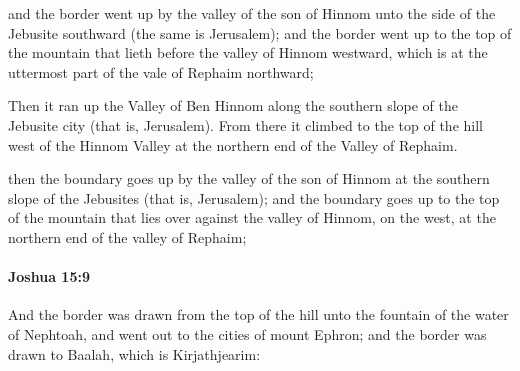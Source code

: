 			\begin{versebox}
					\item[BHS] 
					\item[ASV] and the border went up by the valley of the son of Hinnom unto the side of the Jebusite southward (the same is Jerusalem); and the border went up to the top of the mountain that lieth before the valley of Hinnom westward, which is at the uttermost part of the vale of Rephaim northward;
					\item[NIV] Then it ran up the Valley of Ben Hinnom along the southern slope of the Jebusite city (that is, Jerusalem). From there it climbed to the top of the hill west of the Hinnom Valley at the northern end of the Valley of Rephaim.
					\item[NRSV] then the boundary goes up by the valley of the son of Hinnom at the southern slope of the Jebusites (that is, Jerusalem); and the boundary goes up to the top of the mountain that lies over against the valley of Hinnom, on the west, at the northern end of the valley of Rephaim;
			\end{versebox}

		\paragraph{Joshua 15:9} %
			\label{JOSHUA-15-9}

			And the border was drawn from the top of the hill unto the fountain of the water of Nephtoah, and went out to the cities of mount Ephron; and the border was drawn to Baalah, which is Kirjathjearim:

